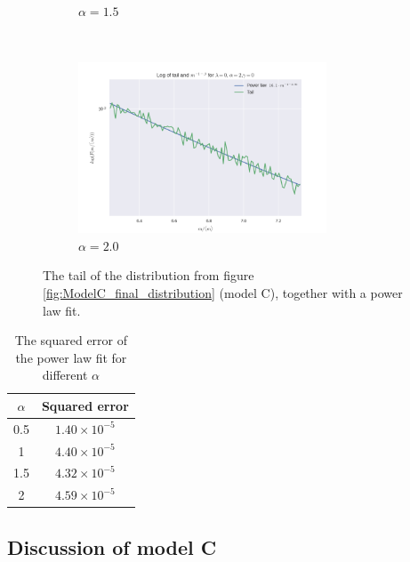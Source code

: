 \documentclass[a4paper, 10pt]{article}
\begin{document}
\begin{figure}[!ht]
\begin{subfigure}[H!]{0.5\textwidth}
        \caption{$\alpha = 1.5$}
    \end{subfigure}
     ~
    \begin{subfigure}[H!]{0.5\textwidth}
        \centering
        \includegraphics[height=2.0in]{tailL0A2G0.png}
        \caption{$\alpha = 2.0$}
    \end{subfigure}
\caption{The tail of the distribution from figure \ref{fig:ModelC_final_distribution} (model C), together with a power law fit.}\label{fig:ModelC_tail}
\end{figure} 
\begin{table}[!hb]
\centering
\caption{The squared error of the power law fit for different $\alpha$}\label{tab:Parameters_C}
\begin{tabular}{|c|c|}
\hline
$\alpha$ & Squared error\\
\hline
0.5& $1.40 \times 10^{-5}$\\
1& $4.40 \times 10^{-5}$\\
1.5 & $4.32 \times 10^{-5}$\\
2& $4.59\times 10^{-5}$\\
\hline
\end{tabular}
\end{table}
\newpage
\subsection{Discussion of model C}
\end{document}
